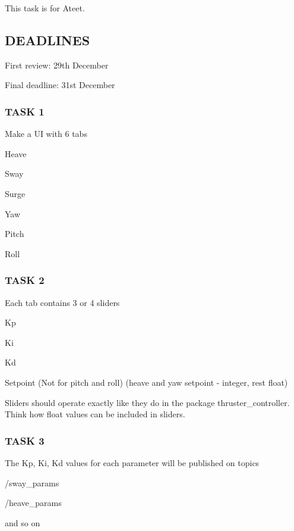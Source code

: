 This task is for Ateet.

\subsection*{D\+E\+A\+D\+L\+I\+N\+ES}

First review\+: 29th December

Final deadline\+: 31st December

\subsubsection*{T\+A\+SK 1}

Make a UI with 6 tabs
\begin{DoxyItemize}
\item Heave
\item Sway
\item Surge
\item Yaw
\item Pitch
\item Roll
\end{DoxyItemize}

\subsubsection*{T\+A\+SK 2}

Each tab contains 3 or 4 sliders
\begin{DoxyItemize}
\item Kp
\item Ki
\item Kd
\item Setpoint (Not for pitch and roll) (heave and yaw setpoint -\/ integer, rest float)
\end{DoxyItemize}

Sliders should operate exactly like they do in the package thruster\+\_\+controller. Think how float values can be included in sliders.

\subsubsection*{T\+A\+SK 3}

The Kp, Ki, Kd values for each parameter will be published on topics
\begin{DoxyItemize}
\item {\ttfamily /sway\+\_\+params}
\item {\ttfamily /heave\+\_\+params}
\item and so on
\end{DoxyItemize}

